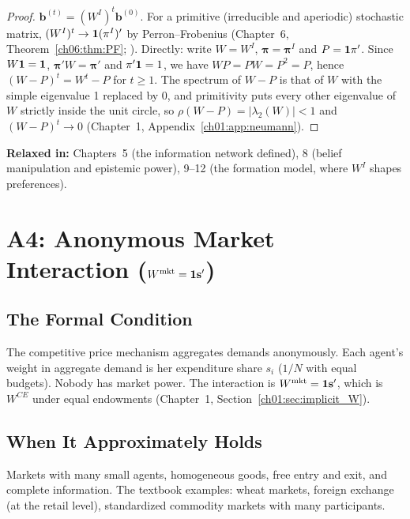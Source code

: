 \documentclass[../structural_economics_book.tex]{subfiles}
\begin{document}
\begin{proof}
$\mathbf{b}^{(t)} = (W^I)^t\mathbf{b}^{(0)}$. For a primitive (irreducible and aperiodic) stochastic matrix, $(W^I)^t \to \mathbf{1}(\pi^I)'$ by Perron--Frobenius (Chapter~6, Theorem~\ref{ch06:thm:PF}; \citealt[Thm.~8.5.1]{horn2012matrix}). Directly: write $W = W^I$, $\boldsymbol{\pi} = \boldsymbol{\pi}^I$ and $P = \mathbf{1}\pi'$. Since $W\mathbf{1} = \mathbf{1}$, $\boldsymbol{\pi}'W = \boldsymbol{\pi}'$ and $\pi'\mathbf{1} = 1$, we have $WP = PW = P^2 = P$, hence $(W - P)^t = W^t - P$ for $t \ge 1$. The spectrum of $W - P$ is that of $W$ with the simple eigenvalue 1 replaced by 0, and primitivity puts every other eigenvalue of $W$ strictly inside the unit circle, so $\rho(W - P) = |\lambda_2(W)| < 1$ and $(W - P)^t \to 0$ (Chapter~1, Appendix~\ref{ch01:app:neumann}).
\end{proof}

\textbf{Relaxed in:} Chapters~5 (the information network defined), 8 (belief manipulation and epistemic power), 9--12 (the formation model, where $W^I$ shapes preferences).


\section{A4: Anonymous Market Interaction (\texorpdfstring{$W^{\text{mkt}} = \mathbf{1}\mathbf{s}'$}{W\textasciicircum mkt = 1s'})}
\label{ch04:sec:A4}

\subsection{The Formal Condition}

The competitive price mechanism aggregates demands anonymously. Each agent's weight in aggregate demand is her expenditure share $s_i$ ($1/N$ with equal budgets). Nobody has market power. The interaction is $W^{\text{mkt}} = \mathbf{1}\mathbf{s}'$, which is $W^{CE}$ under equal endowments (Chapter~1, Section~\ref{ch01:sec:implicit_W}).

\subsection{When It Approximately Holds}

Markets with many small agents, homogeneous goods, free entry and exit, and complete information. The textbook examples: wheat markets, foreign exchange (at the retail level), standardized commodity markets with many participants.
\end{document}
